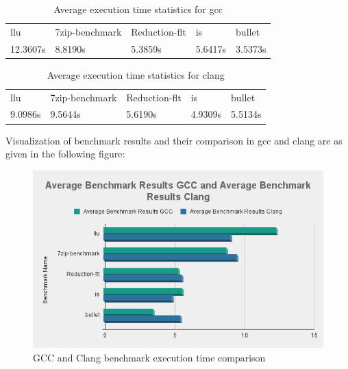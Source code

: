 \documentclass[16pt]{article}
\begin{document}
    \clearpage %
    
    \noindent
    \begin{table}
    \centering
    \begin{tabular}{ |p{2.5cm}|p{2.5cm}|p{2.5cm}|p{2.5cm}|p{2.5cm}| }
    \hline
    \rowcolor{lightgray}\multicolumn{5}{|c|}{Average Benchmark Results GCC} \\
    \hline
    \rowcolor{green!80!yellow!50}
    llu & 7zip-benchmark & Reduction-flt & is & bullet \\
    \hline
     12.3607s & 8.8190s & 5.3859s & 5.6417s & 3.5373s  \\
    \hline
    \end{tabular}
    \caption{Average execution time statistics for gcc}
    \label{GCC average execution statistics}
    \end{table}

    \noindent
    \begin{table}
    \centering
    \begin{tabular}{ |p{2.5cm}|p{2.5cm}|p{2.5cm}|p{2.5cm}|p{2.5cm}| }
    \hline
    \rowcolor{lightgray}\multicolumn{5}{|c|}{Average Benchmark Results Clang} \\
    \hline
    \rowcolor{green!80!yellow!50}
    llu & 7zip-benchmark & Reduction-flt & is & bullet \\
    \hline
    9.0986s & 9.5644s & 5.6190s & 4.9309s & 5.5134s  \\
    \hline
    \end{tabular}
    \caption{Average execution time statistics for clang}
    \label{Clang average execution statistics}
    \end{table}
    \noindent
    Visualization of benchmark results and their comparison in gcc and clang are as given in the following figure:
    \begin{figure}[h!]
        \centering
        \includegraphics[width=0.96\linewidth]{Average Benchmark Results GCC and Average Benchmark Results Clang.png}
        \caption{GCC and Clang benchmark execution time comparison}
        \label{fig1: GCC and Clang becnhmark time comparison}
    \end{figure}
\end{document}

